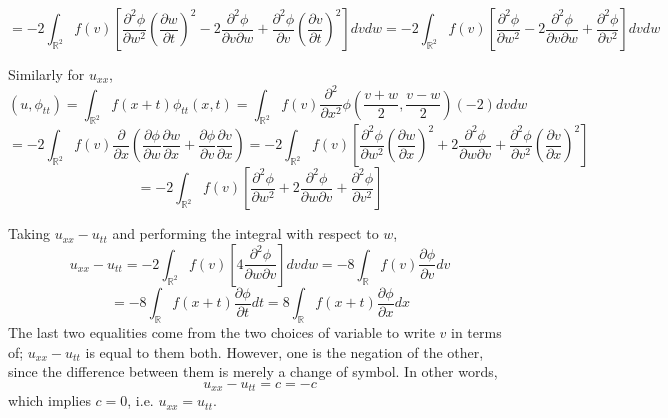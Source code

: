 \documentclass{article}
\begin{document}
\[=-2\int_{\mathbb{R}^2}f(v)\left[ \frac{\partial^2\phi}{\partial w^2}\left( \frac{\partial w}{\partial t} \right)^2-2\frac{\partial^2\phi}{\partial v\partial w}+\frac{\partial^2\phi}{\partial v}\left( \frac{\partial v}{\partial t} \right)^2 \right]dvdw=-2\int_{\mathbb{R}^2}f(v)\left[ \frac{\partial^2\phi}{\partial w^2}-2\frac{\partial^2\phi}{\partial v\partial w}+\frac{\partial^2\phi}{\partial v^2} \right]dvdw\]

Similarly for $u_{xx}$,
\[(u,\phi_{tt})=\int_{\mathbb{R}^2}f(x+t)\phi_{tt}(x,t)=\int_{\mathbb{R}^2}f(v)\frac{\partial^2}{\partial x^2}\phi\left(\frac{v+w}{2},\frac{v-w}{2}\right)(-2)dvdw\]
\[=-2\int_{\mathbb{R}^2}f(v)\frac{\partial}{\partial x}\left(\frac{\partial \phi}{\partial w}\frac{\partial w}{\partial x}+\frac{\partial \phi}{\partial v}\frac{\partial v}{\partial x}  \right)=-2\int_{\mathbb{R}^2}f(v)\left[ \frac{\partial^2\phi}{\partial w^2}\left( \frac{\partial w}{\partial x} \right)^2+2\frac{\partial^2\phi}{\partial w\partial v}+\frac{\partial^2 \phi}{\partial v^2}\left( \frac{\partial v}{\partial x} \right)^2 \right]\]
\[=-2\int_{\mathbb{R}^2}f(v)\left[  \frac{\partial^2\phi}{\partial w^2}+2\frac{\partial^2\phi}{\partial w\partial v}+\frac{\partial^2\phi}{\partial v^2}\right]\]

Taking $u_{xx}-u_{tt}$ and performing the integral with respect to $w$,
\[u_{xx}-u_{tt}=-2\int_{\mathbb{R}^2}f(v)\left[4\frac{\partial^2\phi}{\partial w\partial v}\right]dvdw=-8\int_{\mathbb{R}}f(v)\frac{\partial\phi}{\partial v}dv\]
\[=-8\int_\mathbb{R}f(x+t)\frac{\partial \phi}{\partial t}dt=8\int_\mathbb{R}f(x+t)\frac{\partial \phi}{\partial x}dx\]
The last two equalities come from the two choices of variable to write $v$ in terms of; $u_{xx}-u_{tt}$ is equal to them both. However, one is the negation of the other, since the difference between them is merely a change of symbol. In other words,
\[u_{xx}-u_{tt}=c=-c\]
which implies $c=0$, i.e. $u_{xx}=u_{tt}$.
\end{document}
